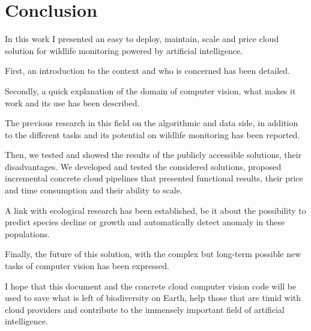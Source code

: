 
\chapter{Conclusion}


In this work I presented an easy to deploy, maintain, scale and price cloud solution for wildlife monitoring powered by artificial intelligence.

First, an introduction to the context and who is concerned has been detailed.

Secondly, a quick explanation of the domain of computer vision, what makes it work and its use has been described.

The previous research in this field on the algorithmic and data side, in addition to the different tasks and its potential on wildlife monitoring has been reported.

Then, we tested and showed the results of the publicly accessible solutions, their disadvantages.
We developed and tested the considered solutions, proposed incremental concrete cloud pipelines that presented functional results, their price and time consumption and their ability to scale.

A link with ecological research has been established, be it about the possibility to predict species decline or growth and automatically detect anomaly in these populations.

Finally, the future of this solution, with the complex but long-term possible new tasks of computer vision has been expressed.

I hope that this document and the concrete cloud computer vision code will be used to save what is left of biodiversity on Earth, help those that are timid with cloud providers and contribute to the immensely important field of artificial intelligence.